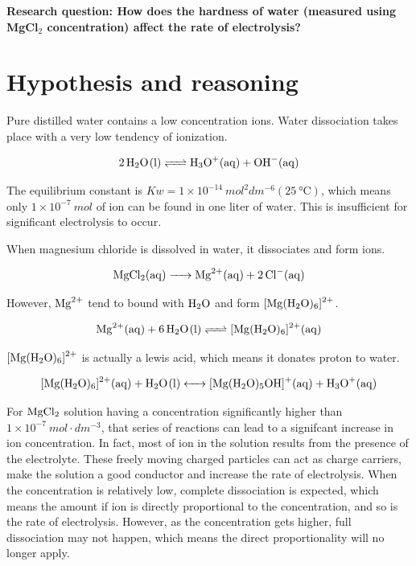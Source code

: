\documentclass[a4paper]{article}
\begin{document}
\textbf{Research question: How does the hardness of water (measured using MgCl$_2$ concentration) affect the rate of electrolysis?}


\section{Hypothesis and reasoning}

Pure distilled water contains a low concentration ions. Water dissociation takes place with a very low tendency of ionization.

\begin{equation}
    \ce{2H2O(l) <=> H3O+(aq) + OH-(aq)}
\end{equation}

The equilibrium constant is $Kw=1\times10^{-14} \SI{}{mol^2 dm^{-6}}(\SI{25}{\degreeCelsius})$, which means only $1\times 10^{-7}\SI{}{mol}$ of ion can be found in one liter of water. This is insufficient for significant electrolysis to occur.  

When magnesium chloride is dissolved in water, it dissociates and form ions.

\begin{equation}
    \ce{MgCl2(aq) -> Mg^2+(aq) + 2 Cl-(aq)}
\end{equation}

However, $\ce{Mg^2+}$ tend to bound with $\ce{H2O}$ and form $\ce{[Mg(H2O)6]^2+}$.

\begin{equation}
    \ce{Mg^2+(aq) + 6 H2O(l) <=> [Mg(H2O)6]^2+(aq)}
\end{equation}

$\ce{[Mg(H2O)6]^2+}$ is actually a lewis acid, which means it donates proton to water. 

\begin{equation}
    \ce{[Mg(H2O)6]^2+(aq) + H2O(l) <-> [Mg(H2O)5OH]^+(aq) + H3O^+(aq)}
\end{equation}

For $\ce{MgCl2}$ solution having a concentration significantly higher than $1\times 10^{-7} \SI{}{mol\cdot dm^{-3}}$, that series of reactions can lead to a signifcant increase in ion concentration. In fact, most of ion in the solution results from the presence of the electrolyte. These freely moving charged particles can act as charge carriers, make the solution a good conductor and increase the rate of electrolysis. When the concentration is relatively low, complete dissociation is expected, which means the amount if ion is directly proportional to the concentration, and so is the rate of electrolysis. However, as the concentration gets higher, full dissociation may not happen, which means the direct proportionality will no longer apply.
\end{document}
